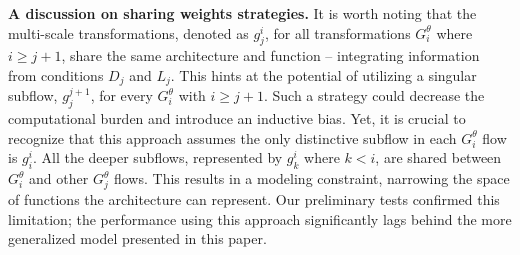 \smallskip

\textbf{A discussion on sharing weights strategies.} It is worth noting that the multi-scale transformations, denoted as \(g_j^i\), for all transformations \(G_i^{\theta}\) where \(i \geq j+1\), share the same architecture and function – integrating information from conditions \(D_j\) and \(L_j\). This hints at the potential of utilizing a singular subflow, \(g_j^{j+1}\), for every \(G_i^{\theta}\) with \(i \geq j+1\). Such a strategy could decrease the computational burden and introduce an inductive bias. Yet, it is crucial to recognize that this approach assumes the only distinctive subflow in each \(G_i^{\theta}\) flow is \(g_i^i\). All the deeper subflows, represented by \(g_k^i\) where \(k<i\), are shared between \(G_i^{\theta}\) and other \(G_j^{\theta}\) flows. This results in a modeling constraint, narrowing the space of functions the architecture can represent. Our preliminary tests confirmed this limitation; the performance using this approach significantly lags behind the more generalized model presented in this paper.

